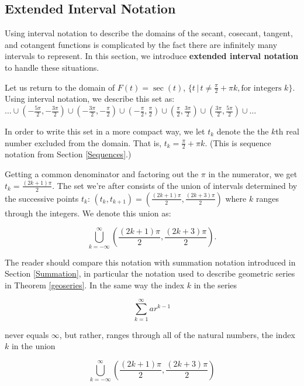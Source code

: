 \documentclass{ximera}
\begin{document}
\subsection{Extended Interval Notation}
\label{extendedinterval}


Using interval notation to describe the domains of the secant, cosecant, tangent, and cotangent functions is complicated by the fact there are infinitely many intervals to represent.  In this section, we introduce \textbf{extended interval notation} to handle these situations.



Let us return to the domain of $F(t) = \sec(t)$, $\{ t \, | \, t \neq  \frac{\pi}{2} + \pi k, \text{for integers $k$} \}$.  Using interval notation, we describe this set as: $\ldots \cup \left( -\frac{5\pi}{2}, -\frac{3\pi}{2}\right) \cup \left( -\frac{3\pi}{2}, -\frac{\pi}{2}\right) \cup  \left(-\frac{\pi}{2}, \frac{\pi}{2}\right) \cup \left(\frac{\pi}{2}, \frac{3\pi}{2}\right) \cup  \left(\frac{3\pi}{2}, \frac{5\pi}{2}\right) \cup \ldots$



In order to write this set in a more compact way, we let $t_{k}$ denote the  the $k$th real number excluded from the domain.  That is,  $t_{k} =  \frac{\pi}{2} + \pi k$.  (This is sequence notation from Section \ref{Sequences}.)



Getting a common denominator and factoring out the $\pi$ in the numerator, we get  $t_{k} = \frac{(2k+1)\pi}{2}$.  The set we're after consists of the union of intervals determined by the successive points $t_{k}$:   $\left(t_{k}, t_{k+1}\right) = \left( \frac{(2k+1)\pi}{2},  \frac{(2k+3)\pi}{2}\right)$ where $k$ ranges through the integers.  We denote this union as:

\[\bigcup_{k = -\infty}^{\infty} \left( \frac{(2k+1)\pi}{2}, \frac{(2k+3) \pi}{2} \right).\]


The reader should compare this notation with summation notation introduced in Section \ref{Summation}, in particular the notation used to describe geometric series in Theorem \ref{geoseries}.  In the same way the index $k$ in the series

 \[\sum_{k = 1}^{\infty} a r^{k-1}\] 
 
 never equals $\infty$, but rather, ranges through all of the natural numbers, the index $k$ in the union 
 
 \[\bigcup_{k = -\infty}^{\infty} \left( \frac{(2k+1)\pi}{2}, \frac{(2k+3) \pi}{2} \right)\] 
 
\end{document}
